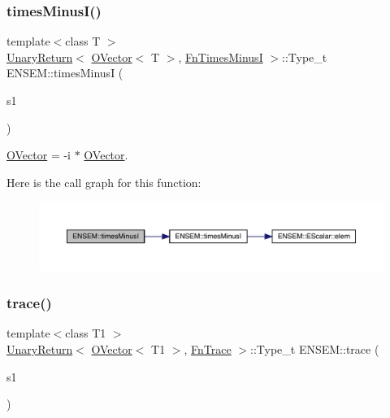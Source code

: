 \subsubsection{\texorpdfstring{timesMinusI()}{timesMinusI()}}
{\footnotesize\ttfamily template$<$class T $>$ \\
\mbox{\hyperlink{structENSEM_1_1UnaryReturn}{Unary\+Return}}$<$ \mbox{\hyperlink{classENSEM_1_1OVector}{O\+Vector}}$<$ T $>$, \mbox{\hyperlink{structENSEM_1_1FnTimesMinusI}{Fn\+Times\+MinusI}} $>$\+::Type\+\_\+t E\+N\+S\+E\+M\+::times\+MinusI (\begin{DoxyParamCaption}\item[{const \mbox{\hyperlink{classENSEM_1_1OVector}{O\+Vector}}$<$ T $>$ \&}]{s1 }\end{DoxyParamCaption})\hspace{0.3cm}{\ttfamily [inline]}}



\mbox{\hyperlink{classENSEM_1_1OVector}{O\+Vector}} = -\/i $\ast$ \mbox{\hyperlink{classENSEM_1_1OVector}{O\+Vector}}. 

Here is the call graph for this function\+:\nopagebreak
\begin{figure}[H]
\begin{center}
\leavevmode
\includegraphics[width=350pt]{da/d59/group__obsvector_ga54c8e8c422afecbe2b647d021d931efb_cgraph}
\end{center}
\end{figure}
\mbox{\label{group__obsvector_ga7b30f87898883f11b8b43b5b3df77bea}} 
\subsubsection{\texorpdfstring{trace()}{trace()}}
{\footnotesize\ttfamily template$<$class T1 $>$ \\
\mbox{\hyperlink{structENSEM_1_1UnaryReturn}{Unary\+Return}}$<$ \mbox{\hyperlink{classENSEM_1_1OVector}{O\+Vector}}$<$ T1 $>$, \mbox{\hyperlink{structENSEM_1_1FnTrace}{Fn\+Trace}} $>$\+::Type\+\_\+t E\+N\+S\+E\+M\+::trace (\begin{DoxyParamCaption}\item[{const \mbox{\hyperlink{classENSEM_1_1OVector}{O\+Vector}}$<$ T1 $>$ \&}]{s1 }\end{DoxyParamCaption})\hspace{0.3cm}{\ttfamily [inline]}}

